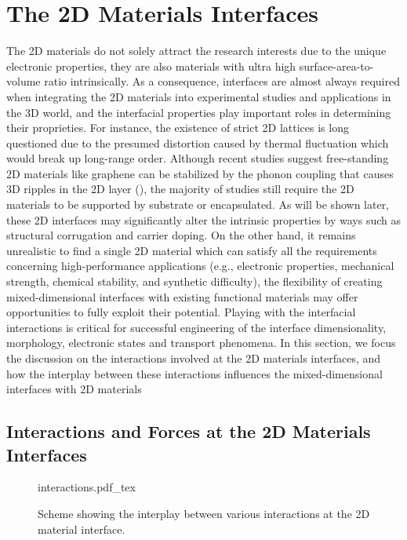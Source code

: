 \section{The 2D Materials Interfaces}
\label{sec:2d-mater-interf}
The 2D materials do not solely attract the research interests due to
the unique electronic properties, they are also materials with ultra
high surface-area-to-volume ratio intrinsically. As a consequence,
interfaces are almost always required when integrating the 2D
materials into experimental studies and applications in the 3D world,
and the interfacial properties play important roles in determining
their proprieties. For instance, the existence of strict 2D lattices
is long questioned due to the presumed distortion caused by thermal
fluctuation which would break up long-range order. Although recent
studies suggest free-standing 2D materials like graphene can be
stabilized by the phonon coupling that causes 3D ripples in the 2D
layer (), the majority of studies
still require the 2D materials to be supported by substrate or
encapsulated.  As will be shown later, these 2D interfaces may
significantly alter the intrinsic properties by ways such as
structural corrugation and carrier doping. On the other hand, it
remains unrealistic to find a single 2D material which can satisfy all
the requirements concerning high-performance applications (e.g.,
electronic properties, mechanical strength, chemical stability, and
synthetic difficulty), the flexibility of creating mixed-dimensional
interfaces with existing functional materials may offer opportunities
to fully exploit their potential. Playing with the interfacial
interactions is critical for successful engineering of the interface
dimensionality, morphology, electronic states and transport phenomena.
In this section, we focus the discussion on the interactions involved
at the 2D materials interfaces, and how the interplay between these
interactions influences the mixed-dimensional interfaces with 2D
materials 

\subsection{Interactions and Forces at the 2D Materials Interfaces}
\label{sec:inter-forc-at}

\begin{figure}[htbp]
  \centering
  {interactions.pdf_tex}
  \caption{\label{fig:intro-interactions} %
    Scheme showing the interplay between various interactions at the
    2D material interface.
  }
\end{figure}

